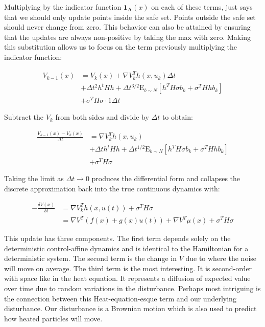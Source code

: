 \documentclass[a4paper]{article}
\begin{document}
Multiplying by the indicator function $\mathbf{1_A}(x)$ on each of these terms, just says that we should only update points inside the safe set.
Points outside the safe set should never change from zero.
This behavior can also be attained by ensuring that the updates are always non-positive by taking the max with zero.
Making this substitution allows us to focus on the term previously multiplying the indicator function:

\begin{align}
V_{k-1}(x) & = V_k( x ) + \nabla V_k^T h(x,u_k) \Delta t
\\ & + \Delta t^2 h^t H h + \Delta t^{3/2} \mathrm{E}_{b\sim N} [ h^T H \sigma b_k + \sigma^T H h b_k]
\\ & + \sigma^T H \sigma \cdot 1 \Delta t
\end{align}

Subtract the $V_k$ from both sides and divide by $\Delta t$ to obtain:

\begin{align}
\frac{V_{k-1}(x) - V_k(x)}{\Delta t} & = \nabla V_k^T h(x,u_k)
\\ & + \Delta t h^t H h + \Delta t^{1/2} \mathrm{E}_{b\sim N} [ h^T H \sigma b_k + \sigma^T H h b_k]
\\ & + \sigma^T H \sigma
\end{align}

Taking the limit as $\Delta t \rightarrow 0$ produces the differential form and collapses the discrete approximation back into the true continuous dynamics with:

\begin{align}
-\frac{\delta V(x)}{\delta t} &= \nabla V_k^T h(x,u(t)) + \sigma^T H \sigma
\\ &= \nabla V^T (f(x) + g(x) u(t)) + \nabla V^T \mu(x) + \sigma^T H \sigma
\label{eq:beautiful}
\end{align}

This update has three components.
The first term depends solely on the deterministic control-affine dynamics and is identical to the Hamiltonian for a deterministic system.
The second term is the change in $V$ due to where the noise will move on average.
The third term is the most interesting.
It is second-order with space like in the heat equation.
It represents a diffusion of expected value over time due to random variations in the disturbance.
Perhaps most intriguing is the connection between this Heat-equation-esque term and our underlying disturbance.
Our disturbance is a Brownian motion which is also used to predict how heated particles will move.
\end{document}
